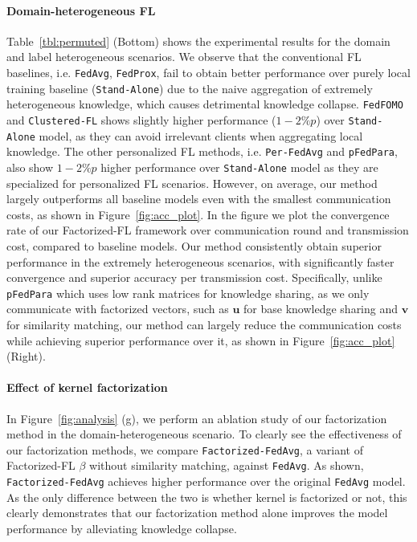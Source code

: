 


\paragraph{Domain-heterogeneous FL}
Table~\ref{tbl:permuted} (Bottom) shows the experimental results for the domain and label heterogeneous scenarios. We observe that the conventional FL baselines, i.e. \texttt{FedAvg}, \texttt{FedProx}, fail to obtain better performance over purely local training baseline (\texttt{Stand-Alone}) due to the naive aggregation of extremely heterogeneous knowledge, which causes detrimental knowledge collapse. \texttt{FedFOMO} and \texttt{Clustered-FL} shows slightly higher performance ($1-2\%p$) over \texttt{Stand-Alone} model, as they can avoid irrelevant clients when aggregating local knowledge. The other personalized FL methods, i.e. \texttt{Per-FedAvg} and \texttt{pFedPara}, also show $1-2\%p$ higher performance over \texttt{Stand-Alone} model as they are specialized for personalized FL scenarios. 
However, on average, our method largely outperforms all baseline models even with the smallest communication costs, as shown in Figure~\ref{fig:acc_plot}. In the figure we plot the convergence rate of our Factorized-FL framework over communication round and transmission cost, compared to baseline models. Our method consistently obtain superior performance in the extremely heterogeneous scenarios, with significantly faster convergence and superior accuracy per transmission cost. Specifically, unlike \texttt{pFedPara} which uses low rank matrices for knowledge sharing, as we only communicate with factorized vectors, such as  $\textbf{u}$ for base knowledge sharing and $\textbf{v}$ for similarity matching, our method can largely reduce the communication costs while achieving superior performance over it, as shown in Figure~\ref{fig:acc_plot} (Right). 





\paragraph{Effect of kernel factorization} 
In Figure~\ref{fig:analysis} (g), we perform an ablation study of our factorization method in the domain-heterogeneous scenario. To clearly see the effectiveness of our factorization methods, we compare \texttt{Factorized-FedAvg}, a variant of Factorized-FL $\beta$ without similarity matching, against \texttt{FedAvg}. As shown, \texttt{Factorized-FedAvg} achieves higher performance over the original \texttt{FedAvg} model. As the only difference between the two is whether kernel is factorized or not, this clearly demonstrates that our factorization method alone improves the model performance by alleviating knowledge collapse.

